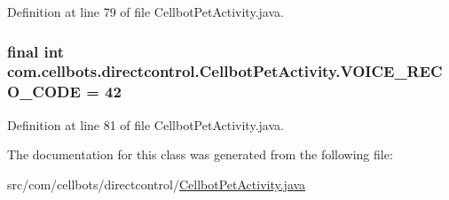 Definition at line 79 of file Cellbot\-Pet\-Activity.\-java.

\hypertarget{classcom_1_1cellbots_1_1directcontrol_1_1_cellbot_pet_activity_a9e900de856474be2bc5431d0d3109222}{
\subsubsection[{V\-O\-I\-C\-E\-\_\-\-R\-E\-C\-O\-\_\-\-C\-O\-D\-E}]{\setlength{\rightskip}{0pt plus 5cm}final int {\bf com.\-cellbots.\-directcontrol.\-Cellbot\-Pet\-Activity.\-V\-O\-I\-C\-E\-\_\-\-R\-E\-C\-O\-\_\-\-C\-O\-D\-E} = 42}}\label{classcom_1_1cellbots_1_1directcontrol_1_1_cellbot_pet_activity_a9e900de856474be2bc5431d0d3109222}


Definition at line 81 of file Cellbot\-Pet\-Activity.\-java.



The documentation for this class was generated from the following file\-:\begin{DoxyCompactItemize}
\item 
src/com/cellbots/directcontrol/\hyperlink{_cellbot_pet_activity_8java}{Cellbot\-Pet\-Activity.\-java}\end{DoxyCompactItemize}
